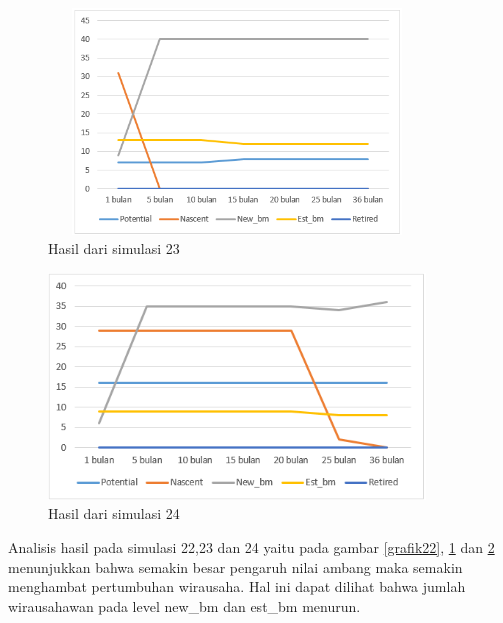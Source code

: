 	\begin{figure} [H]
	\centering  
	\includegraphics[width=10cm, height=6cm]{grafik23} 
		\caption[Hasil dari simulasi 23]{Hasil dari simulasi 23}
	\label{grafik23} 
\end{figure}

	\begin{figure} [H]
	\centering  
	\includegraphics[width=10cm, height=6cm]{grafik24} 
		\caption[Hasil dari simulasi 24]{Hasil dari simulasi 24}
	\label{grafik24} 
\end{figure}

Analisis hasil pada simulasi 22,23 dan 24 yaitu pada gambar \ref{grafik22}, \ref{grafik23} dan \ref{grafik24} menunjukkan bahwa semakin besar pengaruh nilai ambang maka semakin menghambat pertumbuhan wirausaha. Hal ini dapat dilihat bahwa jumlah wirausahawan pada level new\_bm dan est\_bm menurun.
